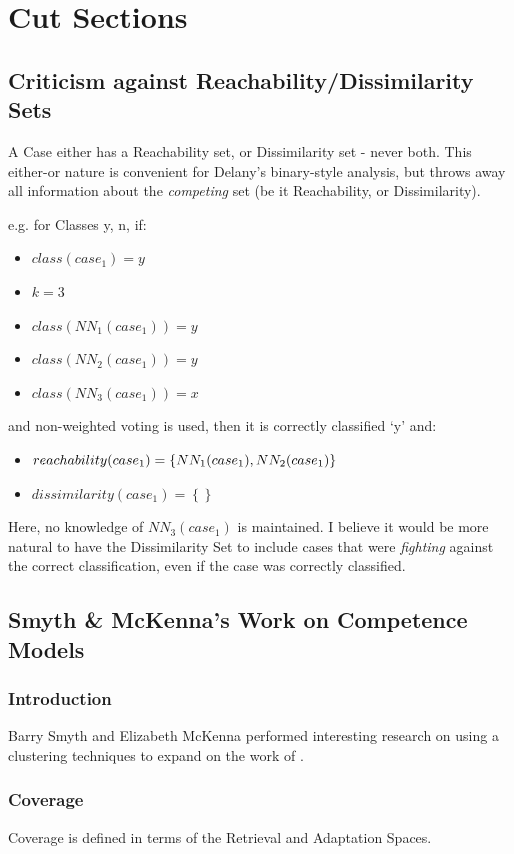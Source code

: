 \documentclass[a4paper,11pt]{report}
\begin{document}
\section{Cut Sections}
\subsection{Criticism against Reachability/Dissimilarity Sets}
A Case either has a Reachability set, or Dissimilarity set - never both. This either-or nature is convenient for Delany's binary-style analysis, but throws away all information about the \emph{competing} set (be it Reachability, or Dissimilarity).

e.g. for Classes {y, n}, if:
\begin{itemize}
	\item $class(case_{1})=y$ 
	\item $k = 3$
	\item $class(NN_{1}(case_{1})) = y$ 
	\item $class(NN_{2}(case_{1})) = y$
	\item $class(NN_{3}(case_{1})) = x$  
\end{itemize}
and non-weighted voting is used, then it is correctly classified `y' and:
\begin{itemize}
	\item $reachability(case_{1})=\left\{ NN_{1}(case_{1}),\hphantom{}NN_{2}(case_{1})\right\} $
	\item $dissimilarity(case_{1})=\left\{ \right\} $
\end{itemize}

Here, no knowledge of $NN_{3}(case_{1})$ is maintained. I believe it would be more natural to have the Dissimilarity Set to include cases that were \emph{fighting} against the correct classification, even if the case was correctly classified.

\subsection{Smyth \& McKenna's Work on Competence Models}
\subsubsection{Introduction}
Barry Smyth and Elizabeth McKenna performed interesting research on using a clustering techniques to expand on the work of \citet{Smyth1995} \citep{Smyth1998}.

\subsubsection{Coverage}
Coverage is defined in terms of the Retrieval and Adaptation Spaces.
\end{document}
